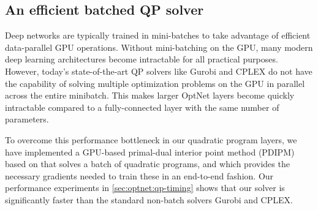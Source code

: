 \subsection{An efficient batched QP solver}
\label{sec:optnet:qp-solver}

Deep networks are typically trained in mini-batches to take advantage
of efficient data-parallel GPU operations.
Without mini-batching on the GPU, many modern deep learning
architectures become intractable for all practical purposes.
However, today's state-of-the-art QP solvers like Gurobi and CPLEX
do not have the capability of solving multiple optimization
problems on the GPU in parallel across the entire minibatch.
This makes larger OptNet layers become quickly intractable
compared to a fully-connected layer with the same number of parameters.

To overcome this performance bottleneck in our quadratic program layers,
we have implemented a GPU-based primal-dual interior point
method (PDIPM) based on \citet{mattingley2012cvxgen}
that solves a batch of quadratic programs, and which provides the necessary
gradients needed to train these in an end-to-end fashion.
Our performance experiments in \cref{sec:optnet:qp-timing} shows
that our solver is significantly faster than the standard
non-batch solvers Gurobi and CPLEX.


